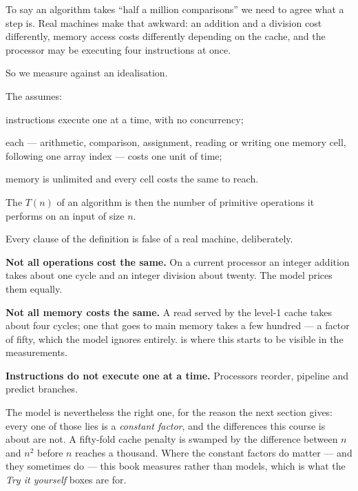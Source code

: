 To say an algorithm takes ``half a million comparisons'' we need to agree what
a step is. Real machines make that awkward: an addition and a division cost
differently, memory access costs differently depending on the cache, and the
processor may be executing four instructions at once.

So we measure against an idealisation.

\begin{definitionbox}
The  assumes:

\begin{tight}
  \item instructions execute one at a time, with no concurrency;
  \item each  --- arithmetic, comparison, assignment,
        reading or writing one memory cell, following one array index --- costs
        one unit of time;
  \item memory is unlimited and every cell costs the same to reach.
\end{tight}

\smallskip
The  $T(n)$ of an algorithm is then the number of primitive
operations it performs on an input of size $n$.
\end{definitionbox}

\begin{conceptbox}
Every clause of the definition is false of a real machine, deliberately.

\smallskip
\textbf{Not all operations cost the same.} On a current processor an integer
addition takes about one cycle and an integer division about twenty. The model
prices them equally.

\smallskip
\textbf{Not all memory costs the same.} A read served by the level-1 cache
takes about four cycles; one that goes to main memory takes a few hundred ---
a factor of fifty, which the model ignores entirely.  is where
this starts to be visible in the measurements.

\smallskip
\textbf{Instructions do not execute one at a time.} Processors reorder,
pipeline and predict branches.

\smallskip
The model is nevertheless the right one, for the reason the next section gives:
every one of those lies is a \emph{constant factor}, and the differences this
course is about are not. A fifty-fold cache penalty is swamped by the
difference between $n$ and $n^2$ before $n$ reaches a thousand. Where the
constant factors do matter --- and they sometimes do --- this book measures
rather than models, which is what the \emph{Try it yourself} boxes are for.
\end{conceptbox}

